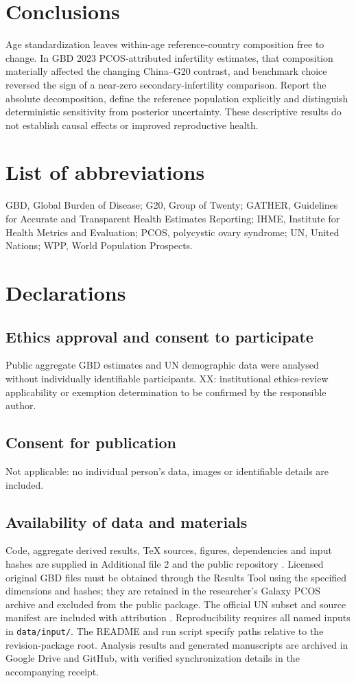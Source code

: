 \documentclass[11pt,a4paper]{article}
\begin{document}
\section{Conclusions}
Age standardization leaves within-age reference-country composition free to change. In GBD 2023 PCOS-attributed infertility estimates, that composition materially affected the changing China--G20 contrast, and benchmark choice reversed the sign of a near-zero secondary-infertility comparison. Report the absolute decomposition, define the reference population explicitly and distinguish deterministic sensitivity from posterior uncertainty. These descriptive results do not establish causal effects or improved reproductive health.

\section*{List of abbreviations}
GBD, Global Burden of Disease; G20, Group of Twenty; GATHER, Guidelines for Accurate and Transparent Health Estimates Reporting; IHME, Institute for Health Metrics and Evaluation; PCOS, polycystic ovary syndrome; UN, United Nations; WPP, World Population Prospects.

\section*{Declarations}
\subsection*{Ethics approval and consent to participate}
Public aggregate GBD estimates and UN demographic data were analysed without individually identifiable participants. XX: institutional ethics-review applicability or exemption determination to be confirmed by the responsible author.
\subsection*{Consent for publication}
Not applicable: no individual person's data, images or identifiable details are included.
\subsection*{Availability of data and materials}
Code, aggregate derived results, TeX sources, figures, dependencies and input hashes are supplied in Additional file 2 and the public repository \cite{repository}. Licensed original GBD files must be obtained through the Results Tool \cite{results} using the specified dimensions and hashes; they are retained in the researcher's Galaxy PCOS archive and excluded from the public package. The official UN subset and source manifest are included with attribution \cite{wpp2024}. Reproducibility requires all named inputs in \texttt{data/input/}. The README and run script specify paths relative to the revision-package root. Analysis results and generated manuscripts are archived in Google Drive and GitHub, with verified synchronization details in the accompanying receipt.
\end{document}
